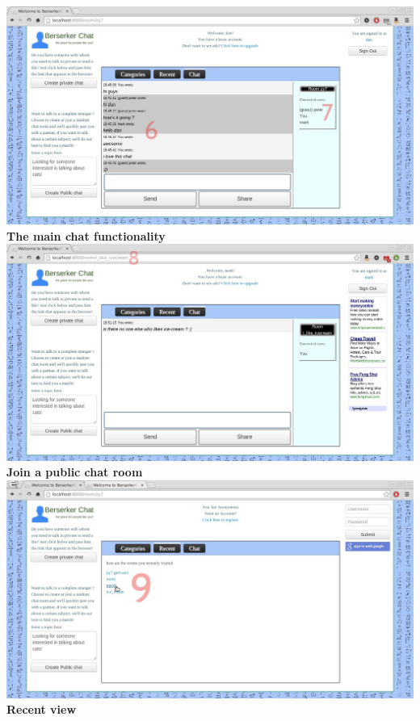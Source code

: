\documentclass{sig-alt-release2}
\begin{document}
\includegraphics[scale=0.26]{chat-user_2.jpg}
\textbf{The main chat functionality} \\
\includegraphics[scale=0.26]{public-joined_3.jpg}
\textbf{Join a public chat room} \\
\includegraphics[scale=0.26]{recent_4.jpg}
\textbf{Recent view} \\
\end{document}

